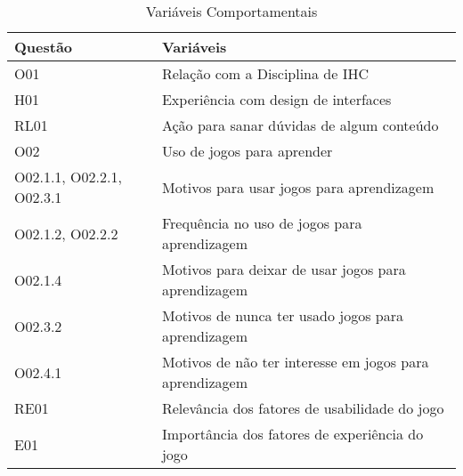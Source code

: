 \begin{table}[htbp]
\centering
\caption{Variáveis Comportamentais}
\label{tab:Table_variaveis-comp}
\begin{tabular}{|p{4.7cm}|p{10cm}|}
\hline
\textbf{Questão} & \textbf{Variáveis}                             \\ \hline
O01   &  Relação com a Disciplina de IHC                          \\ \hline
H01   &  Experiência com design de interfaces                      \\ \hline
RL01   &  Ação para sanar dúvidas de algum conteúdo               \\ \hline
O02  &  Uso de jogos para aprender                \\ \hline
O02.1.1, O02.2.1, O02.3.1   &  Motivos para usar jogos para aprendizagem\\ \hline
O02.1.2, O02.2.2   &  Frequência no uso de jogos para aprendizagem\\ \hline
O02.1.4  & Motivos para deixar de usar jogos para aprendizagem       \\ \hline
O02.3.2  &  Motivos de nunca ter usado jogos para aprendizagem    \\ \hline
O02.4.1  & Motivos de não ter interesse em jogos para aprendizagem       \\ \hline
RE01  & Relevância dos fatores de usabilidade do jogo          \\ \hline
E01   & Importância dos fatores de experiência do jogo        \\ \hline
\end{tabular}
\end{table}